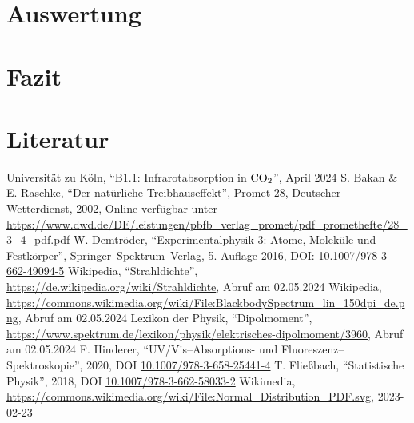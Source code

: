 \documentclass[12pt,a4paper]{scrartcl}
\numberwithin{equation}{section} %
\renewcommand{\[}{} %
\renewcommand{\]}{\noindent} %
\begin{document}
\clearpage
\hypertarget{auswertung}{%
\section{Auswertung}\label{auswertung}}

\clearpage
\hypertarget{fazit}{%
\section{Fazit}\label{fazit}}

\clearpage
\hypertarget{literatur}{%
\section{Literatur}\label{literatur}}
\renewcommand{\section}[2]{} %
\begin{thebibliography}{9}
	Universität zu Köln, ``B1.1: Infrarotabsorption in \(\ce{CO_2}\)'', April 2024
  S. Bakan \& E. Raschke, ``Der natürliche Treibhauseffekt'', Promet 28,
	Deutscher Wetterdienst, 2002, Online verfügbar unter
	\url{https://www.dwd.de/DE/leistungen/pbfb_verlag_promet/pdf_promethefte/28_3_4_pdf.pdf}
	W. Demtröder, ``Experimentalphysik 3: Atome, Moleküle und Festkörper'',
	Springer--Spektrum--Verlag, 5. Auflage 2016, DOI:
	\href{https://doi.org/10.1007/978-3-662-49094-5}{10.1007/978-3-662-49094-5}
	Wikipedia, ``Strahldichte'',
	\url{https://de.wikipedia.org/wiki/Strahldichte}, Abruf am 02.05.2024
	Wikipedia, \url{https://commons.wikimedia.org/wiki/File:BlackbodySpectrum_lin_150dpi_de.png},
	Abruf am 02.05.2024
	Lexikon der Physik, ``Dipolmoment'',
	\url{https://www.spektrum.de/lexikon/physik/elektrisches-dipolmoment/3960},
	Abruf am 02.05.2024
	F. Hinderer, ``UV/Vis--Absorptions- und Fluoreszenz--Spektroskopie'',
	2020, DOI \href{https://doi.org/10.1007/978-3-658-25441-4}{10.1007/978-3-658-25441-4}
	T. Fließbach, ``Statistische Physik'', 2018, DOI
	\href{https://doi.org/10.1007/978-3-662-58033-2}{10.1007/978-3-662-58033-2}
	Wikimedia,
	\url{https://commons.wikimedia.org/wiki/File:Normal_Distribution_PDF.svg},
	2023-02-23
\end{thebibliography}
\end{document}
